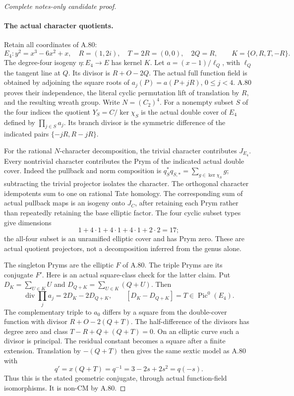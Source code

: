 \begin{proof}[Complete notes-only candidate proof]
\paragraph{The actual character quotients.}
Retain all coordinates of A.80:
\[
 E_4:y^2=x^3-6x^2+x,\quad
 R=(1,2i),\quad T=2R=(0,0),\quad 2Q=R,
 \qquad K=\{O,R,T,-R\}.
\]
The degree-four isogeny \(\eta:E_4\to E\) has kernel \(K\).
Let \(a=(x-1)/\ell_Q\), with \(\ell_Q\) the tangent line
at \(Q\). Its divisor is \(R+O-2Q\).
The actual full function field is obtained by adjoining the square
roots of \(a_j(P)=a(P+jR)\), \(0\le j<4\).
A.80 proves their independence, the literal cyclic permutation
lift of translation by \(R\), and the resulting wreath group.
Write \(N=(C_2)^4\). For a nonempty subset \(S\) of the four
indices the quotient \(Y_S=C/\ker\chi_S\) is the actual double
cover of \(E_4\) defined by \(\prod_{j\in S}a_j\).
Its branch divisor is the symmetric difference of the indicated
pairs \(\{-jR,R-jR\}\).

For the rational \(N\)-character decomposition, the trivial
character contributes \(J_{E_4}\). Every nontrivial character
contributes the Prym of the indicated actual double cover.
Indeed the pullback and norm composition is
\(q_S^*q_{S,*}=\sum_{g\in\ker\chi_S}g\); subtracting the
trivial projector isolates the character. The orthogonal character
idempotents sum to one on rational Tate homology. The corresponding
sum of actual pullback maps is an isogeny onto \(J_C\), after
retaining each Prym rather than repeatedly retaining the base
elliptic factor. The four cyclic subset types give dimensions
\[
 1+4\cdot1+4\cdot1+4\cdot1+2\cdot2=17;              \tag{FW.2}
\]
the all-four subset is an unramified elliptic cover and has Prym
zero. These are actual quotient projectors, not a decomposition
inferred from the genus alone.

The singleton Pryms are the elliptic \(F\) of A.80. The triple
Pryms are its conjugate \(F'\). Here is an actual square-class
check for the latter claim. Put \(D_K=\sum_{U\in K}U\) and
\(D_{Q+K}=\sum_{U\in K}(Q+U)\). Then
\[
 \operatorname{div}\prod_j a_j=2D_K-2D_{Q+K},
 \qquad [D_K-D_{Q+K}]=T\in\operatorname{Pic}^0(E_4).
                                                               \tag{FW.3}
\]
The complementary triple to \(a_0\) differs by a square from
the double-cover function with divisor \(R+O-2(Q+T)\).
The half-difference of the divisors has degree zero and class
\(T-R+Q+(Q+T)=0\). On an elliptic curve such a divisor is
principal. The residual constant becomes a square after a finite
extension. Translation by \(-(Q+T)\) then gives the same
sextic model as A.80 with
\[
 q'=x(Q+T)=q^{-1}=3-2s+2s^2=q(-s).                    \tag{FW.4}
\]
Thus this is the stated geometric conjugate, through actual
function-field isomorphisms. It is non-CM by A.80.


\end{proof}
